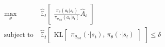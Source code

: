 %
\begin{align}
    \label{eqn:TRPO_optimal_max}
    \max_\theta\ & \hat{\mathbb{E}}_t\begin{bmatrix}\frac{\pi_{\theta}(a_t|s_t)}{\pi_{\theta_{\text{old}}}(a_t|s_t)}\hat{A}_t\end{bmatrix} \\
    \label{eqn:TRPO_optimal_sub}
    \text{subject to}\ & \hat{\mathbb{E}}_t\begin{bmatrix}\text{KL}\begin{bmatrix}\pi_{\theta_{old}}(\cdot|s_t),\, \pi_{\theta}(\cdot|s_t)\end{bmatrix}\end{bmatrix} \leq \delta
\end{align}

